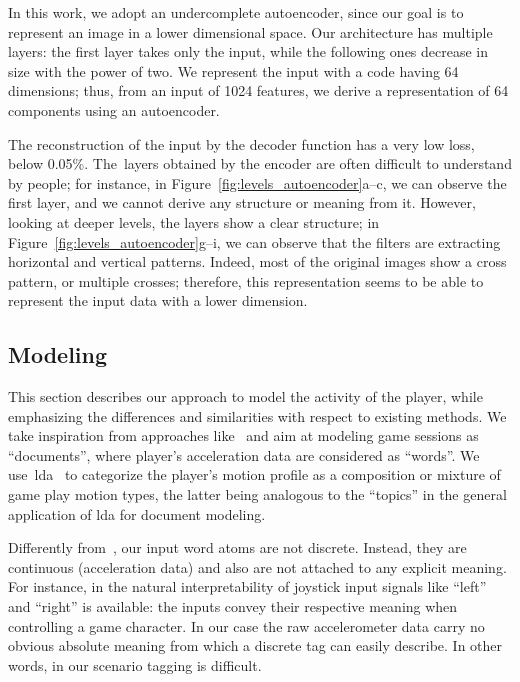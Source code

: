 In this work, we adopt an undercomplete autoencoder, since our goal is to represent an image in a lower dimensional space. 
Our architecture has multiple layers: the first layer takes only the input, while the following ones decrease in size with the power of two.
We represent the input with a code having 64 dimensions; thus, from an input of 1024 features, we derive a representation of 64 components using an autoencoder.

The reconstruction of the input by the decoder function has a very low loss, below 0.05\%. The~layers obtained by the encoder are often difficult to understand by people; for instance, in Figure~\ref{fig:levels_autoencoder}a--c, we can observe the first layer, and we cannot derive any structure or meaning from it. However, looking at deeper levels, the layers show a clear structure; in Figure~\ref{fig:levels_autoencoder}g--i, we can observe that the filters are extracting horizontal and vertical patterns. Indeed, most of the original images show a cross pattern, or multiple crosses; therefore, this representation seems to be able to represent the input data with a lower dimension.

\subsection{Modeling}
This section describes our approach to model the activity of the player, while emphasizing the differences and similarities with respect to existing methods. We take inspiration from approaches like~\cite{smith_mining_2016, wang_encoding_2015, wang_imaging_2015} and aim at modeling game sessions as ``documents'', where player's acceleration data are considered as ``words''. We use~\gls{lda}~\cite{blei_latent_2003} to categorize the player's motion profile as a composition or mixture of game play motion types, the latter being analogous to the ``topics'' in the general application of \gls{lda} for document modeling.

Differently from~\cite{smith_mining_2016}, our input word atoms are not discrete. Instead, they are continuous (acceleration data) and also are not attached to any explicit meaning. For instance, in \cite{smith_mining_2016} the natural interpretability of joystick input signals like ``left'' and ``right'' is available: the inputs convey their respective meaning when controlling a game character. In our case the raw accelerometer data carry no obvious absolute meaning from which a discrete tag can easily describe. In other words, in our scenario tagging is difficult.

